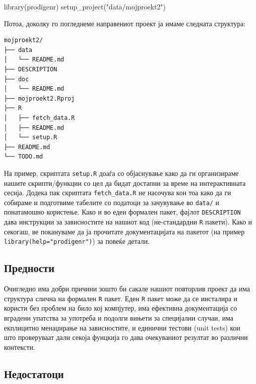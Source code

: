 \documentclass[
]{book}
\newenvironment{Shaded}{\begin{snugshade}}{\end{snugshade}}
\newcommand{\FunctionTok}[1]{\textcolor[rgb]{0.00,0.00,0.00}{#1}}
\newcommand{\NormalTok}[1]{#1}
\newcommand{\StringTok}[1]{\textcolor[rgb]{0.31,0.60,0.02}{#1}}
\begin{document}
\begin{Shaded}
\begin{Highlighting}[]
\FunctionTok{library}\NormalTok{(prodigenr)}
\FunctionTok{setup\_project}\NormalTok{(}\StringTok{"data/mojproekt2"}\NormalTok{)}
\end{Highlighting}
\end{Shaded}

Потоа, доколку го погледнеме направениот проект ја имаме следната структура:

\begin{verbatim}
mojproekt2/
├── data
│   └── README.md
├── DESCRIPTION
├── doc
│   └── README.md
├── mojproekt2.Rproj
├── R
│   ├── fetch_data.R
│   ├── README.md
│   └── setup.R
├── README.md
└── TODO.md
\end{verbatim}

На пример, скриптата \texttt{setup.R} доаѓа со објаснување како да ги организираме нашите скрипти/функции со цел да бидат достапни за време на интерактивната сесија. Додека пак скриптата \texttt{fetch\_data.R} не насочува кон тоа како да ги собираме и подготвиме табелите со податоци за зачувување во \texttt{data/} и понатамошно користење. Како и во еден формален пакет, фајлот \texttt{DESCRIPTION} дава инструкции за зависностите на нашиот код (не-стандардни \texttt{R} пакети). Како и секогаш, ве покануваме да ја прочитате документацијата на пакетот (на пример \texttt{library(help="prodigenr")}) за повеќе детали.

\hypertarget{ux43fux440ux435ux434ux43dux43eux441ux442ux438-1}{%
\subsection{Предности}\label{ux43fux440ux435ux434ux43dux43eux441ux442ux438-1}}

Очигледно има добри причини зошто би сакале нашиот повторлив проект да има структура слична на формален \texttt{R} пакет. Еден \texttt{R} пакет може да се инсталира и користи без проблем на било кој компјутер, има ефективна документација со вградени упатства за употреба и подолги вињети за специјални случаи, има екплицитно менаџирање на зависностите, и единични тестови (unit tests) кои што проверуваат дали секоја фунцкија го дава очекуваниот резултат во различни контексти.

\hypertarget{ux43dux435ux434ux43eux441ux442ux430ux442ux43eux446ux438-1}{%
\subsection{Недостатоци}\label{ux43dux435ux434ux43eux441ux442ux430ux442ux43eux446ux438-1}}
\end{document}
